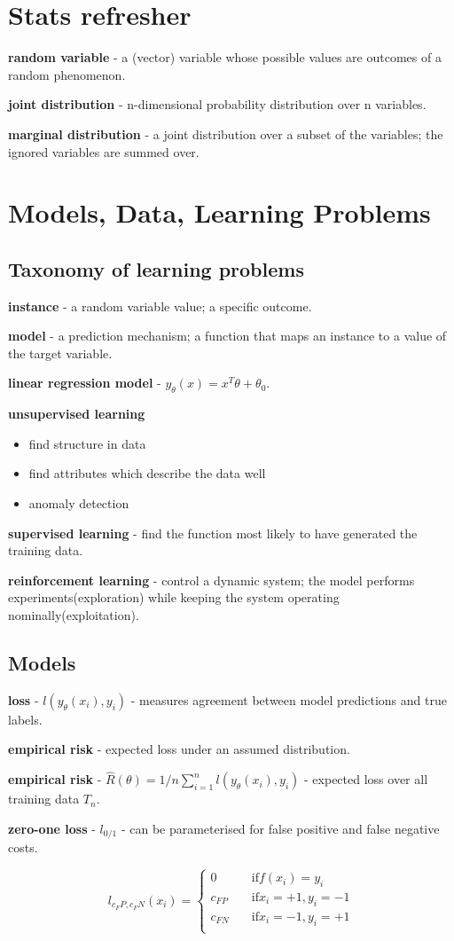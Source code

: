 \documentclass{article}
\newcommand{\para}[0]{\par\vspace{0.2cm}\noindent}
\newcommand{\define}[2]{\textbf{#1} - {#2}.  \para}
\begin{document}
\section{Stats refresher}
\define{random variable}
           {a (vector) variable whose possible values are outcomes of a random phenomenon}
\define{joint distribution}
           {n-dimensional probability distribution over n variables}
\define{marginal distribution}
           {a joint distribution over a subset of the variables; the ignored variables are summed over}


\section{Models, Data, Learning Problems}
\subsection{Taxonomy of learning problems}
\define{instance}
           {a random variable value; a specific outcome}
\define{model}
           {a prediction mechanism; a function that maps an instance to a value of the target variable}
\define{linear regression model}
           {$y_\theta(x) = x^T \theta + \theta_0$}
\textbf{unsupervised learning}
           \begin{itemize}
                \item{find structure in data}
                \item{find attributes which describe the data well}
                \item{anomaly detection}
           \end{itemize}
\para
\define{supervised learning}
           {find the function most likely to have generated the training data}
\define{reinforcement learning}
           {control a dynamic system; the model performs experiments(exploration) while keeping the system operating nominally(exploitation)}


\subsection{Models}
\define{loss}
           {$l(y_\theta(x_i), y_i)$ - measures agreement between model predictions and true labels}
\define{empirical risk}
           {expected loss under an assumed distribution}
\define{empirical risk}
           {$\hat R(\theta) = 1/n \sum_{i=1}^n l(y_\theta(x_i), y_i)$ - expected loss over all training data $T_n$}
\define{zero-one loss}
           {$l_{0/1}$ - can be parameterised for false positive and false negative costs}
$$l_{c_FP, c_FN}(x_i) =
  \begin{cases}
    0         & \quad \mathrm{if } f(x_i) = y_i  \\
    c_{FP}    & \quad \mathrm{if } x_i = +1, y_i = -1  \\
    c_{FN}    & \quad \mathrm{if } x_i = -1, y_i = +1  \\
  \end{cases}$$
\end{document}
